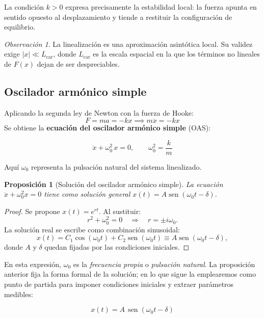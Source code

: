 \documentclass[12pt, a4paper]{article}
\theoremstyle{plain}
\newtheorem{proposicion}[teorema]{Proposición}
\theoremstyle{definition}
\theoremstyle{remark}
\newtheorem*{observacion}{Observación}
\DeclareMathOperator{\sen}{sen}
\begin{document}
La condición $k>0$ expresa precisamente la estabilidad local: la fuerza apunta en sentido
opuesto al desplazamiento y tiende a restituir la configuración de equilibrio.
\begin{observacion}
La linealización es una aproximación asintótica local. Su validez exige
$|x| \ll L_{\text{car}}$, donde $L_{\text{car}}$ es la escala espacial en la que
los términos no lineales de $F(x)$ dejan de ser despreciables.
\end{observacion}

\subsection{Oscilador armónico simple}

Aplicando la segunda ley de Newton con la fuerza de Hooke:
\begin{equation}
  F = ma = -kx \implies m\ddot{x} = -kx
\end{equation}
Se obtiene la \textbf{ecuación del oscilador armónico simple} (OAS):
\begin{mdframed}[style=resultado]
\begin{equation}
  \ddot{x} + \omega_0^2\,x = 0, \qquad \omega_0^2 = \frac{k}{m}
\end{equation}
\end{mdframed}
Aquí $\omega_0$ representa la pulsación natural del sistema linealizado.

\begin{proposicion}[Solución del oscilador armónico simple]
La ecuación $\ddot{x}+\omega_0^2x=0$ tiene como solución general
$x(t)=A\sen(\omega_0 t-\delta)$.
\end{proposicion}

\begin{proof}
Se propone $x(t)=e^{rt}$. Al sustituir:
\begin{equation}
  r^2+\omega_0^2=0 \quad\Rightarrow\quad r=\pm i\omega_0.
\end{equation}
La solución real se escribe como combinación sinusoidal:
\begin{equation}
  x(t)=C_1\cos(\omega_0 t)+C_2\sen(\omega_0 t)
      \equiv A\sen(\omega_0 t-\delta),
\end{equation}
donde $A$ y $\delta$ quedan fijadas por las condiciones iniciales.
\end{proof}

En esta expresión, $\omega_0$ es la \emph{frecuencia propia} o \emph{pulsación natural}. La proposición
anterior fija la forma formal de la solución; en lo que sigue la emplearemos como punto de
partida para imponer condiciones iniciales y extraer parámetros medibles:
\begin{mdframed}[style=resultado]
\begin{equation}
  x(t) = A\,\sen(\omega_0 t - \delta)
\end{equation}
\end{mdframed}
\end{document}
